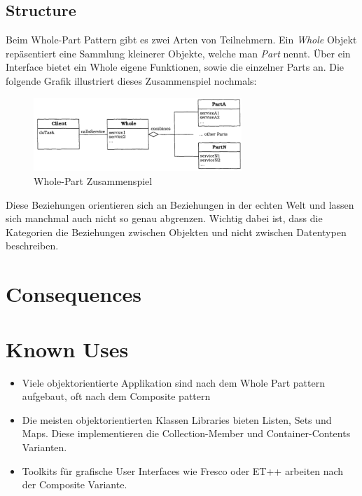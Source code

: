 \subsection{Structure}
Beim Whole-Part Pattern gibt es zwei Arten von Teilnehmern.
Ein \textit{Whole} Objekt repäsentiert eine Sammlung kleinerer Objekte, welche man  \textit{Part} nennt. Über ein Interface bietet ein Whole eigene Funktionen, sowie die einzelner Parts an. Die folgende Grafik illustriert dieses Zusammenspiel nochmals:
\begin{figure}[H]
	\centering
	\includegraphics[width=0.7\textwidth]{figures/07-wholepart-1}
	\caption{Whole-Part Zusammenspiel}
\end{figure}
Diese Beziehungen orientieren sich an Beziehungen in der echten Welt und lassen sich manchmal auch nicht so genau abgrenzen. 
Wichtig dabei ist, dass die Kategorien die Beziehungen zwischen Objekten und nicht zwischen Datentypen beschreiben.

\section{Consequences}
\begin{itemize}
\end{itemize}

\section{Known Uses}
\begin{itemize}
	\item Viele objektorientierte Applikation sind nach dem Whole Part pattern aufgebaut, oft nach dem Composite pattern
	\item Die meisten objektorientierten Klassen Libraries bieten Listen, Sets und Maps. Diese implementieren die Collection-Member und Container-Contents Varianten.
	\item Toolkits für grafische User Interfaces wie Fresco oder ET++ arbeiten nach der Composite Variante. 
\end{itemize}

